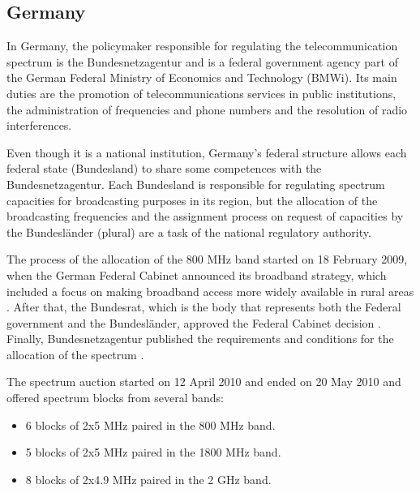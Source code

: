 {%

\subsection*{Germany}
In Germany, the policymaker responsible for regulating the telecommunication spectrum is the Bundesnetzagentur \cite{2-26} and is a federal government agency part of the German Federal Ministry of Economics and Technology (BMWi). Its main duties are the promotion of telecommunications services in public institutions, the administration of frequencies and phone numbers and the resolution of radio interferences.\par

Even though it is a national institution, Germany’s federal structure allows each federal state (Bundesland) to share some competences with the Bundesnetzagentur. Each Bundesland is responsible for regulating spectrum capacities for broadcasting purposes in its region, but the allocation of the broadcasting frequencies and the assignment process on request of capacities by the Bundesländer (plural) are a task of the national regulatory authority.\par

The process of the allocation of the 800 MHz band started on 18 February 2009, when the German Federal Cabinet announced its broadband strategy, which included a focus on making broadband access more widely available in rural areas \cite{2-27}.  After that, the Bundesrat, which is the body that represents both the Federal government and the Bundesländer, approved the Federal Cabinet decision \cite{2-28}. Finally, Bundesnetzagentur published the requirements and conditions for the allocation of the spectrum \cite{2-29}.\par

The spectrum auction started on 12 April 2010 and ended on 20 May 2010 and offered spectrum blocks from several bands:\par

\begin{itemize}
	\item 6 blocks of 2x5 MHz paired in the 800 MHz band.\par

	\item 5 blocks of 2x5 MHz paired in the 1800 MHz band.\par

	\item 8 blocks of 2x4.9 MHz paired in the 2 GHz band.\par


\end{itemize}}
